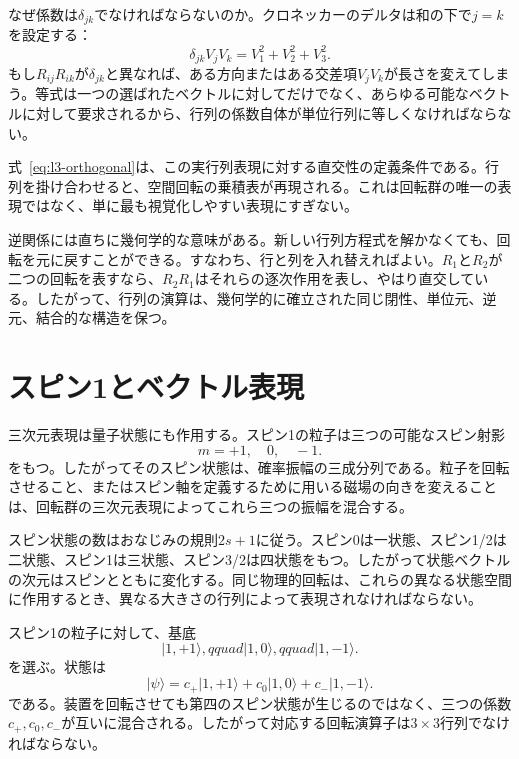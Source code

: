なぜ係数は\(\delta_{jk}\)でなければならないのか。クロネッカーのデルタは和の下で\(j=k\)を設定する：
\begin{equation}
\delta_{jk}V_jV_k=V_1^2+V_2^2+V_3^2.
\end{equation}
もし\(R_{ij}R_{ik}\)が\(\delta_{jk}\)と異なれば、ある方向またはある交差項\(V_jV_k\)が長さを変えてしまう。等式は一つの選ばれたベクトルに対してだけでなく、あらゆる可能なベクトルに対して要求されるから、行列の係数自体が単位行列に等しくなければならない。

式~\eqref{eq:l3-orthogonal}は、この実行列表現に対する直交性の定義条件である。行列を掛け合わせると、空間回転の乗積表が再現される。これは回転群の唯一の表現ではなく、単に最も視覚化しやすい表現にすぎない。

逆関係には直ちに幾何学的な意味がある。新しい行列方程式を解かなくても、回転を元に戻すことができる。すなわち、行と列を入れ替えればよい。\(R_1\)と\(R_2\)が二つの回転を表すなら、\(R_2R_1\)はそれらの逐次作用を表し、やはり直交している。したがって、行列の演算は、幾何学的に確立された同じ閉性、単位元、逆元、結合的な構造を保つ。

\section{スピン1とベクトル表現}

三次元表現は量子状態にも作用する。スピン1の粒子は三つの可能なスピン射影
\begin{equation}
m=+1,\quad 0,\quad -1.
\end{equation}
をもつ。したがってそのスピン状態は、確率振幅の三成分列である。粒子を回転させること、またはスピン軸を定義するために用いる磁場の向きを変えることは、回転群の三次元表現によってこれら三つの振幅を混合する。

スピン状態の数はおなじみの規則\(2s+1\)に従う。スピン0は一状態、スピン1/2は二状態、スピン1は三状態、スピン3/2は四状態をもつ。したがって状態ベクトルの次元はスピンとともに変化する。同じ物理的回転は、これらの異なる状態空間に作用するとき、異なる大きさの行列によって表現されなければならない。

スピン1の粒子に対して、基底
\begin{equation}
\lvert 1,+1\rangle,qquad
\lvert 1,0\rangle,qquad
\lvert 1,-1\rangle.
\end{equation}
を選ぶ。状態は
\begin{equation}
\lvert\psi\rangle
=c_{+}\lvert1,+1\rangle+c_0\lvert1,0\rangle+c_{-}\lvert1,-1\rangle.
\end{equation}
である。装置を回転させても第四のスピン状態が生じるのではなく、三つの係数\(c_+,c_0,c_-\)が互いに混合される。したがって対応する回転演算子は\(3\times3\)行列でなければならない。

